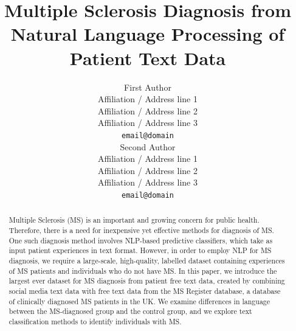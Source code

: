 \documentclass[11pt,a4paper]{article}
\title{Multiple Sclerosis Diagnosis from Natural Language Processing of Patient Text Data}
\author{First Author \\
  Affiliation / Address line 1 \\
  Affiliation / Address line 2 \\
  Affiliation / Address line 3 \\
  \texttt{email@domain} \\\And
  Second Author \\
  Affiliation / Address line 1 \\
  Affiliation / Address line 2 \\
  Affiliation / Address line 3 \\
  \texttt{email@domain} \\}
\date{}
\begin{document}
\maketitle
\begin{abstract}
Multiple Sclerosis (MS) is an important and growing concern for public health. Therefore, there is a need for inexpensive yet effective methods for diagnosis of MS. One such diagnosis method involves NLP-based predictive classifiers, which take as input patient experiences in text format. However, in order to employ NLP for MS diagnosis, we require a large-scale, high-quality, labelled dataset containing experiences of MS patients and individuals who do not have MS. In this paper, we introduce the largest ever dataset for MS diagnosis from patient free text data, created by combining social media text data with free text data from the MS Register database, a database of clinically diagnosed MS patients in the UK. We examine differences in language between the MS-diagnosed group and the control group, and we explore text classification methods to identify individuals with MS.
\end{abstract}
\end{document}
